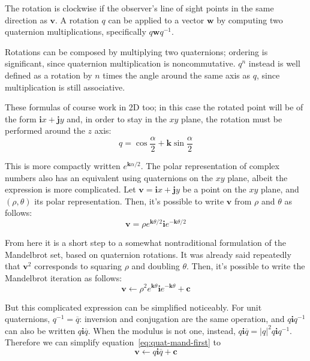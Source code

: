 \documentclass{article}
\let\vec\mathbf
\let\bar\overline
\begin{document}
The rotation is clockwise if the observer's line of sight points in the
same direction as $\vec{v}$.  A rotation $q$ can be applied to a vector
$\vec{w}$ by computing two quaternion multiplications, specifically
$q\vec{w}q^{-1}$.

Rotations can be composed by multiplying two quaternions; ordering is
significant, since quaternion multiplication is noncommutative.  $q^n$
instead is well defined as a rotation by $n$ times the angle around the
same axis as $q$, since multiplication is still associative.

These formulas of course work in 2D too; in this case the rotated
point will be of the form $\vec{i}x+\vec{j}y$ and, in order to stay in
the $xy$ plane, the rotation must be performed around the $z$ axis:
\begin{equation*}
q = \cos \frac\alpha2 + \vec{k} \sin \frac\alpha2
\end{equation*}

\noindent
This is more compactly written $e^{\vec{k}\alpha/2}$.  The polar
representation of complex numbers also has an equivalent using
quaternions on the $xy$ plane, albeit the expression is more
complicated.  Let $\vec{v}=\vec{i}x+\vec{j}y$ be a point on the $xy$
plane, and $(\rho,\theta)$ its polar representation.  Then, it's
possible to write $\vec{v}$ from $\rho$ and $\theta$ as follows:
\begin{equation}
\label{eq:quat-v}
\vec{v}=\rho e^{\vec{k}\theta/2} \vec{i} e^{-\vec{k}\theta/2}
\end{equation}

From here it is a short step to a somewhat nontraditional formulation
of the Mandelbrot set, based on quaternion rotations.  It was already
said repeatedly that $\vec{v}^2$ corresponds to squaring $\rho$ and
doubling $\theta$.  Then, it's possible to write the Mandelbrot
iteration as follows:
\begin{equation}
  \label{eq:quat-mand-first}
\vec{v} \leftarrow \rho^2 e^{\vec{k}\theta} \vec{i} e^{-\vec{k}\theta}+\vec{c}
\end{equation}

But this complicated expression can be simplified noticeably.  For unit
quaternions, $q^{-1}=\bar q$: inversion and conjugation are the same
operation, and $q\vec{i}q^{-1}$ can also be written $q\vec{i}\bar
q$.  When the modulus is not one, instead, $q\vec{i}\bar q = |q|^2
q\vec{i}q^{-1}$.  Therefore we can simplify equation~\ref{eq:quat-mand-first}
to
\begin{equation*}
\vec{v} \leftarrow q \vec{i} \bar q+\vec{c}
\end{equation*}
  
\end{document}
